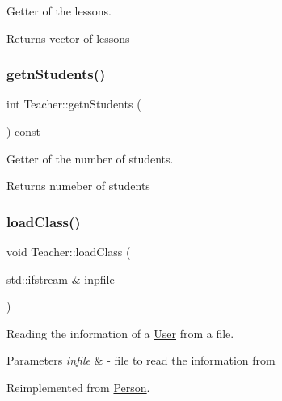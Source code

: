 Getter of the lessons. 

\begin{DoxyReturn}{Returns}
vector of lessons 
\end{DoxyReturn}
\mbox{\label{class_teacher_a430db21f5ff329759302fbd35b6c365c}} 
\subsubsection{\texorpdfstring{getn\+Students()}{getnStudents()}}
{\footnotesize\ttfamily int Teacher\+::getn\+Students (\begin{DoxyParamCaption}{ }\end{DoxyParamCaption}) const}



Getter of the number of students. 

\begin{DoxyReturn}{Returns}
numeber of students 
\end{DoxyReturn}
\mbox{\label{class_teacher_a1f204644af41c43ff3bd0582393062fa}} 
\subsubsection{\texorpdfstring{load\+Class()}{loadClass()}}
{\footnotesize\ttfamily void Teacher\+::load\+Class (\begin{DoxyParamCaption}\item[{std\+::ifstream \&}]{inpfile }\end{DoxyParamCaption})\hspace{0.3cm}{\ttfamily [virtual]}}



Reading the information of a \mbox{\hyperlink{class_user}{User}} from a file. 


\begin{DoxyParams}{Parameters}
{\em infile} & -\/ file to read the information from \\
\hline
\end{DoxyParams}


Reimplemented from \mbox{\hyperlink{class_person_af07a032df8d56dddade4dc43960b536b}{Person}}.

\mbox{\label{class_teacher_aec95be6f77dc2b692627a6f4a5385971}} 
